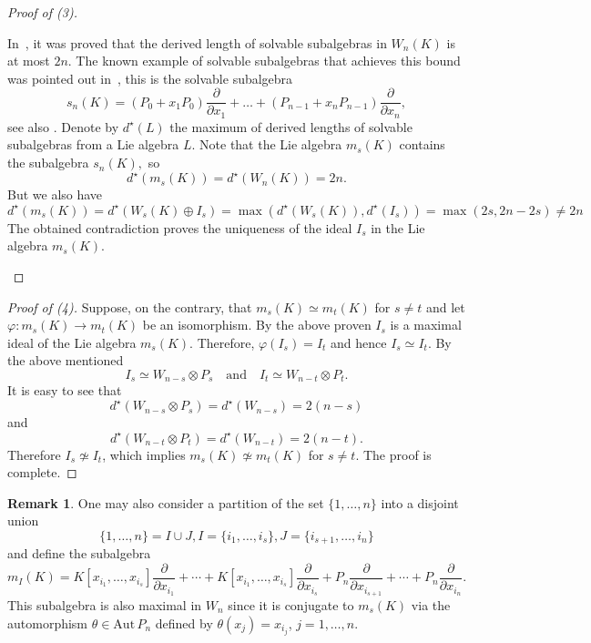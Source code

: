 \documentclass[12pt,a4paper]{amsart}
\theoremstyle{plain}
\theoremstyle{definition}
\newtheorem{remark}{Remark}
\begin{document}
\begin{proof}[Proof of (3)]
\begin{enumerate}
\noindent
In~\cite{MP}, it was proved that the derived length of solvable subalgebras in $W_n(K)$ is at most  $2n$. The known example of solvable subalgebras that achieves this bound was pointed out in~\cite{Martello}, this is the solvable subalgebra
$$s_n(K)=(P_0+x_1P_0)\frac{\partial}{\partial x_1}+\dots+(P_{n-1}+x_nP_{n-1})\frac{\partial}{\partial x_n},$$ 
see also \cite{ESS}.
Denote by $d^{\star}(L)$ the maximum of derived lengths of solvable subalgebras  from a Lie algebra $L$.  Note that the Lie algebra $m_s(K)$ contains the subalgebra $s_n(K),$ so $$d^{\star}(m_s(K))=d^{\star}(W_n(K))=2n.$$
But we also have
\begin{equation*}
	d^{\star}(m_s(K))=d^{\star}(W_{s}(K) \oplus I_{s}) = \max(d^{\star}(W_{s}(K)), d^{\star}(I_{s})) = \max(2s, 2n - 2s) \neq 2n
\end{equation*}
The obtained contradiction proves the uniqueness of the ideal $I_s$ in the Lie algebra $m_s(K).$ 
	\end{enumerate}
\end{proof}
\begin{proof}[Proof of (4)]
	 Suppose, on the contrary, that  $m_s(K)\simeq m_t(K)$ for $s\ne t$ and let 
	$\varphi:m_s(K)\to m_t(K)$ be an isomorphism.
	By the above proven  $I_s$ is a maximal ideal of the Lie algebra $m_s(K)$.
	Therefore, $\varphi(I_s)=I_t$ and hence $I_s\simeq I_t$.
	By the above mentioned
	\[
	I_s\simeq W_{n-s}\otimes P_s \quad\text{and}\quad
	I_t\simeq W_{n-t}\otimes P_t.
	\]
	It is easy to see that  $$d^{\star}(W_{n-s}\otimes P_s)=d^{\star}(W_{n-s})=2(n-s)$$ and $$d^{\star}(W_{n-t}\otimes P_t)=d^{\star}(W_{n-t})=2(n-t).$$
	Therefore  $I_s\not\simeq I_t$, which implies  $m_s(K)\not\simeq m_t(K)$ for $s\ne t$.
	The proof is complete.
\end{proof}

\begin{remark}
	One may also consider a partition of the set $\{1,\ldots,n\}$ into a disjoint union
	$$\{1,\ldots,n\}=I\cup J, I=\{i_1,\ldots,i_s\}, J=\{i_{s+1},\ldots,i_n\}$$
	and define the  subalgebra
	\[
	m_I(K)=K[x_{i_1},\ldots,x_{i_s}]\frac{\partial}{\partial x_{i_1}}
	+\cdots+
	K[x_{i_1},\ldots,x_{i_s}]\frac{\partial}{\partial x_{i_s}}
	+P_n\frac{\partial}{\partial x_{i_{s+1}}}
	+\cdots+
	P_n\frac{\partial}{\partial x_{i_n}}.
	\]
	This subalgebra is also maximal in $W_n$ since it is conjugate to
	$m_s(K)$ via the automorphism $\theta\in \mathrm{Aut}\,P_n$ defined by
	$\theta (x_j)=x_{i_j}$, $j=1, \ldots , n$.
\end{remark}
\end{document}
